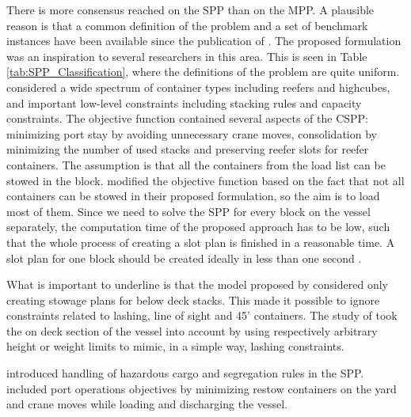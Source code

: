 \documentclass[preprint,12pt,authoryear]{elsarticle}
\begin{document}
There is more consensus reached on the SPP than on the MPP. A plausible reason is that a common definition of the problem and a set of benchmark instances have been available since the publication of \cite{Delgado2009}. The proposed formulation was an inspiration to several researchers in this area. This is seen in Table \ref{tab:SPP_Classification}, where the definitions of the problem are quite uniform. \cite{Delgado2009} considered a wide spectrum of container types including reefers and highcubes, and important low-level constraints including stacking rules and capacity constraints. The objective function contained several aspects of the CSPP: minimizing port stay by avoiding unnecessary crane moves, consolidation by minimizing the number of used stacks and preserving reefer slots for reefer containers. The assumption is that all the containers from the load list can be stowed in the block. \cite{Parreno2016AProblem} modified the objective function based on the fact that not all containers can be stowed in their proposed formulation, so the aim is to load most of them. Since we need to solve the SPP for every block on the vessel separately, the computation time of the proposed approach has to be low, such that the whole process of creating a slot plan is finished in a reasonable time. A slot plan for one block should be created ideally in less than one second \citep{Delgado2012ABays}.

What is important to underline is that the model proposed by \cite{Delgado2009} considered only creating stowage plans for below deck stacks. This made it possible to ignore constraints related to lashing, line of sight and 45' containers. The study of \cite{Kebedow2019IncludingProblem, Jin2019AnBay} took the on deck section of the vessel into account by using respectively arbitrary height or weight limits to mimic, in a simple way, lashing constraints. 

\cite{Parreno2016AProblem, Kebedow2019IncludingProblem} introduced handling of hazardous cargo and segregation rules in the SPP. \cite{Jin2019AnBay, Yifan2016Group-BayShip} included port operations objectives by minimizing restow containers on the yard and crane moves while loading and discharging the vessel.
\end{document}
